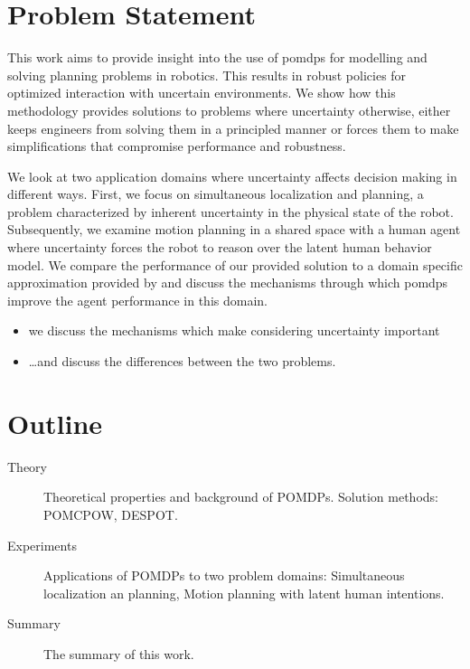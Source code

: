 \section{Problem Statement}


This work aims to provide insight into the use of \acp{pomdp} for modelling and
solving planning problems in robotics. This results in robust policies for
optimized interaction with uncertain environments. We show how this methodology
provides solutions to problems where uncertainty otherwise, either keeps
engineers from solving them in a principled manner or forces them to make
simplifications that compromise performance and robustness.

We look at two application domains where uncertainty affects decision making in
different ways. First, we focus on simultaneous localization and planning,
a problem characterized by inherent uncertainty in the physical state of the
robot. Subsequently, we examine motion planning in a shared space with a human
agent where uncertainty forces the robot to reason over the latent human
behavior model. We compare the performance of our provided solution to a domain
specific approximation provided by \cite{fisac2018probabilistically} and
discuss the mechanisms through which \acp{pomdp} improve the agent performance
in this domain.

\begin{itemize}
  \item we discuss the mechanisms which make considering uncertainty important
  \item \dots and discuss the differences between the two problems.
\end{itemize}

\section{Outline}

\begin{description}
  \item[Theory] Theoretical properties and background of POMDPs. Solution methods: POMCPOW, DESPOT.
  \item[Experiments] Applications of POMDPs to two problem domains: Simultaneous localization an planning, Motion planning with latent human intentions.
  \item[Summary] The summary of this work.
\end{description}
